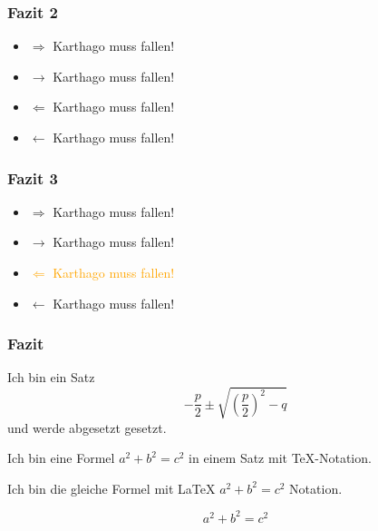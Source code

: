 \documentclass[ngerman]{beamer}
\begin{document}
\begin{frame}
	\frametitle{Fazit 2}
	
\begin{itemize}
	\item<1->  $\Rightarrow$ Karthago muss fallen! 
	\item<2->  $\rightarrow$ Karthago muss fallen!	
	\item<3->  $\Leftarrow$ Karthago muss fallen! 
	\item<4->  $\leftarrow$ Karthago muss fallen!	
\end{itemize}	

\end{frame}

\begin{frame}
	\frametitle{Fazit 3}
	
\begin{itemize}
	\item<-2,4>  $\Rightarrow$ Karthago muss fallen! 
	\item<3->  $\rightarrow$ Karthago muss fallen!	
	\item<1->  \textcolor<2>{orange}{$\Leftarrow$ Karthago muss fallen!} 
	\item<4->  $\leftarrow$ Karthago muss fallen!	
\end{itemize}	

\end{frame}

\begin{frame}
	\frametitle{Fazit}
	
	
Ich bin ein Satz	
\begin{equation}
-\frac{p}{2} \pm \sqrt{   \left(\frac{p}{2}\right)^2  - q   }
\end{equation} und werde abgesetzt gesetzt.

Ich bin eine Formel $a^2+b^2=c^2$ in einem Satz mit TeX-Notation.

Ich bin die gleiche Formel mit LaTeX \( a^2 + b^2 = c^2 \) Notation.

\[  a^2 + b^2 = c^2 \]


	
\end{frame}


	
\end{document}
